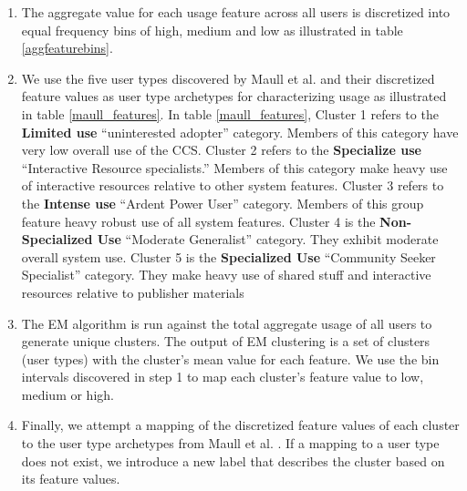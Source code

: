 \documentclass{acm_proc_article-sp}
\begin{document}
\begin{enumerate}
\item The aggregate value for each usage feature across all users is discretized into equal frequency bins of high, medium and low as illustrated in table \ref{aggfeaturebins}.

\item We use the five user types discovered by Maull et al. \cite{maullunderstanding} and their discretized feature values as user type archetypes for characterizing usage as illustrated in table \ref{maull_features}. In table \ref{maull_features}, Cluster 1 refers to the \textbf{Limited use} ``uninterested adopter'' category. Members of this category have very low overall use of the CCS. Cluster 2 refers to the \textbf{Specialize use} ``Interactive Resource specialists.'' Members of this category make heavy use of interactive resources relative to other system features. Cluster 3 refers to the \textbf{Intense use} ``Ardent Power User'' category. Members of this group feature heavy robust use of all system features. Cluster 4 is the \textbf{Non-Specialized Use} ``Moderate Generalist'' category. They exhibit moderate overall system use. Cluster 5 is the \textbf{Specialized Use} ``Community Seeker Specialist'' category. They make heavy use of shared stuff and interactive resources relative to publisher materials

\item The EM algorithm is run against the total aggregate usage of all users to generate unique clusters. The output of EM clustering is a set of clusters (user types) with the cluster's mean value for each feature. We use the bin intervals discovered in step 1 to map each cluster's feature value to low, medium or high.

\item Finally, we attempt a mapping of the discretized feature values of each cluster to the user type archetypes from Maull et al. \cite{maullunderstanding}. If a mapping to a user type does not exist, we introduce a new label that describes the cluster based on its feature values.


\end{enumerate}
\end{document}

